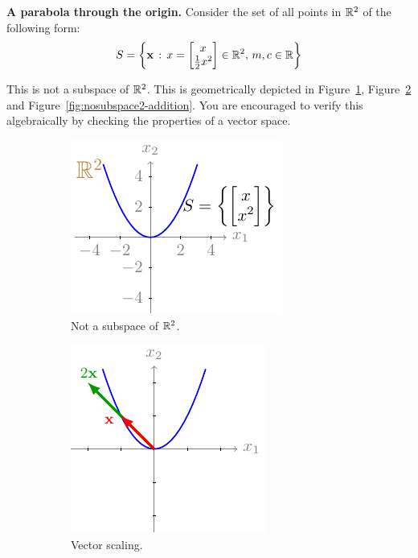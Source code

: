 \begin{example}
    \textbf{A parabola through the origin.} Consider the set of all points in $\mathbb{R}^2$ of the following form:
    \[ S = \lc \mf{x} \, : \, x = \bmxc x \\ \frac{1}{2}x^2 \emx \in \mb{R}^2, \, m, c \in \mb{R} \rc \]

    This is not a subspace of $\mathbb{R}^2$. This is geometrically depicted in Figure~\ref{fig:nosubspace2}, Figure~\ref{fig:nosubspace2-scale} and Figure~\ref{fig:nosubspace2-addition}. You are encouraged to verify this algebraically by checking the properties of a vector space.

    \begin{figure}[h]
        \centering
        \begin{subfigure}[b]{0.32\textwidth}
            \includegraphics{figure/chapter01/nosubspace2(a).pdf}
            \caption{Not a subspace of $\mathbb{R}^2$.}
            \label{fig:nosubspace2}
        \end{subfigure}
        \begin{subfigure}[b]{0.32\textwidth}
            \centering
            \includegraphics{figure/chapter01/nosubspace2(b).pdf}
            \caption{Vector scaling.}
            \label{fig:nosubspace2-scale}
        \end{subfigure}
        \begin{subfigure}[b]{0.32\textwidth}

\end{subfigure}
\end{figure}
\end{example}
